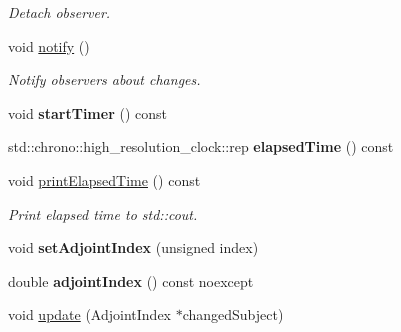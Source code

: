 \begin{DoxyCompactItemize}
\begin{DoxyCompactList}\small\item\em Detach observer. \end{DoxyCompactList}\item 
\hypertarget{classSpacy_1_1Mixin_1_1MixinConnection_a1ddeaa78a3bb4a38c2cca36d1f99fe36}{}void \hyperlink{classSpacy_1_1Mixin_1_1MixinConnection_a1ddeaa78a3bb4a38c2cca36d1f99fe36}{notify} ()\label{classSpacy_1_1Mixin_1_1MixinConnection_a1ddeaa78a3bb4a38c2cca36d1f99fe36}

\begin{DoxyCompactList}\small\item\em Notify observers about changes. \end{DoxyCompactList}\item 
\hypertarget{classSpacy_1_1Mixin_1_1Timer_acf3c292b6d482c7c4ded5f961be4bc4b}{}void {\bfseries start\+Timer} () const\label{classSpacy_1_1Mixin_1_1Timer_acf3c292b6d482c7c4ded5f961be4bc4b}

\item 
\hypertarget{classSpacy_1_1Mixin_1_1Timer_ab27a20d8e1e9bc90ea56cb18ff752798}{}std\+::chrono\+::high\+\_\+resolution\+\_\+clock\+::rep {\bfseries elapsed\+Time} () const\label{classSpacy_1_1Mixin_1_1Timer_ab27a20d8e1e9bc90ea56cb18ff752798}

\item 
\hypertarget{classSpacy_1_1Mixin_1_1Timer_a3b79b35213702118d0823f6040d5a315}{}void \hyperlink{classSpacy_1_1Mixin_1_1Timer_a3b79b35213702118d0823f6040d5a315}{print\+Elapsed\+Time} () const\label{classSpacy_1_1Mixin_1_1Timer_a3b79b35213702118d0823f6040d5a315}

\begin{DoxyCompactList}\small\item\em Print elapsed time to std\+::cout. \end{DoxyCompactList}\item 
\hypertarget{classSpacy_1_1Mixin_1_1AdjointIndex_a30d4dd8b61175144c84c5bbf964528d7}{}void {\bfseries set\+Adjoint\+Index} (unsigned index)\label{classSpacy_1_1Mixin_1_1AdjointIndex_a30d4dd8b61175144c84c5bbf964528d7}

\item 
\hypertarget{classSpacy_1_1Mixin_1_1AdjointIndex_afd5c0f6bd67d20c88ea65b7f8fe4ab45}{}double {\bfseries adjoint\+Index} () const noexcept\label{classSpacy_1_1Mixin_1_1AdjointIndex_afd5c0f6bd67d20c88ea65b7f8fe4ab45}

\item 
\hypertarget{classSpacy_1_1Mixin_1_1AdjointIndex_ad91ccf68601950801cd062afee8a8cf2}{}void \hyperlink{classSpacy_1_1Mixin_1_1AdjointIndex_ad91ccf68601950801cd062afee8a8cf2}{update} (Adjoint\+Index $\ast$changed\+Subject)\label{classSpacy_1_1Mixin_1_1AdjointIndex_ad91ccf68601950801cd062afee8a8cf2}


\end{DoxyCompactItemize}

